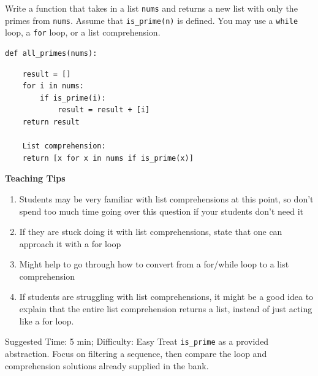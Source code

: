 \begin{blocksection}
\question Write a function that takes in a list \lstinline{nums} and returns a
new list with only the primes from \lstinline{nums}. Assume that
\lstinline{is_prime(n)} is defined. You may use a \lstinline{while} loop, a
\lstinline{for} loop, or a list comprehension.


\begin{lstlisting}
def all_primes(nums):
\end{lstlisting}

\begin{solution}[2in]
\begin{lstlisting}
    result = []
    for i in nums:
        if is_prime(i):
            result = result + [i]
    return result

    List comprehension:
    return [x for x in nums if is_prime(x)]
\end{lstlisting}
\end{solution}
\end{blocksection}

\begin{questionmeta}
    \textbf{Teaching Tips}
    \begin{enumerate}
            \item Students may be very familiar with list comprehensions at this point, so don’t spend too much time going over this question if your students don’t need it
            \item If they are stuck doing it with list comprehensions, state that one can approach it with a for loop
            \item Might help to go through how to convert from a for/while loop to a list comprehension
            \item If students are struggling with list comprehensions, it might be a good idea to explain that the entire list comprehension returns a list, instead of just acting like a for loop.
    \end{enumerate}
\end{questionmeta}

\begin{questionmeta}
    Suggested Time: 5 min; Difficulty: Easy
    Treat \lstinline{is_prime} as a provided abstraction. Focus on filtering a sequence, then compare the loop and comprehension solutions already supplied in the bank.
\end{questionmeta}
